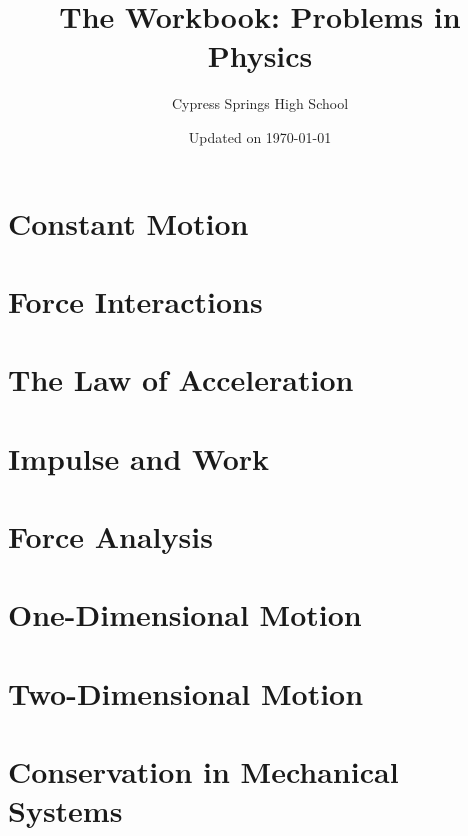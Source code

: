 \documentclass[answers]{exam}
\title{The Workbook: Problems in Physics}
\author{Cypress Springs High School}
\date{Updated on \today}
\newif\ifShowUnitI       %
\newif\ifShowUnitII      %
\newif\ifShowUnitIII     %
\newif\ifShowUnitIV      %
\newif\ifShowUnitV       %
\newif\ifShowUnitVI      %
\newif\ifShowUnitVII     %
\begin{document}
\maketitle

\section{Constant Motion}

\ifShowUnitI

\fi

\section{Force Interactions}

\ifShowUnitII

\fi

\section{The Law of Acceleration}

\ifShowUnitIII

\fi

\section{Impulse and Work}

\ifShowUnitIV

\fi

\section{Force Analysis}

\ifShowUnitV

\fi

\section{One-Dimensional Motion}

\ifShowUnitVI

\fi

\section{Two-Dimensional Motion}

\ifShowUnitVII

\fi

\section{Conservation in Mechanical Systems}
\end{document}
